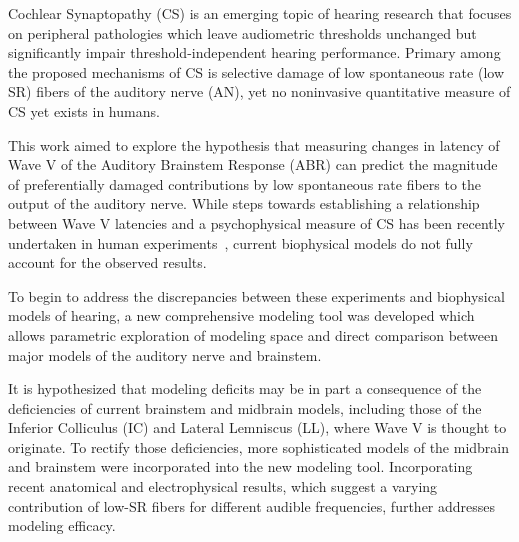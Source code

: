 Cochlear Synaptopathy (CS) is an emerging topic of hearing research that focuses on peripheral pathologies which leave audiometric thresholds unchanged but significantly impair threshold-independent hearing performance. Primary among the proposed mechanisms of CS is selective damage of low spontaneous rate (low SR) fibers of the auditory nerve (AN), yet no noninvasive quantitative measure of CS yet exists in humans.

This work aimed to explore the hypothesis that measuring changes in latency of Wave V of the Auditory Brainstem Response (ABR) can predict the magnitude of preferentially damaged contributions by low spontaneous rate fibers to the output of the auditory nerve. While steps towards establishing a relationship between Wave V latencies and a psychophysical measure of CS has been recently undertaken in human experiments~\cite{Mehraei2016Auditory}, current biophysical models do not fully account for the observed results.

To begin to address the discrepancies between these experiments and biophysical models of hearing, a new comprehensive modeling tool was developed which allows parametric exploration of modeling space and direct comparison between major models of the auditory nerve and brainstem. 

It is hypothesized that modeling deficits may be in part a consequence of the deficiencies of current brainstem and midbrain models, including those of the Inferior Colliculus (IC) and Lateral Lemniscus (LL), where Wave V is thought to originate.  To rectify those deficiencies, more sophisticated models of the midbrain and brainstem were incorporated into the new modeling tool. Incorporating recent anatomical and electrophysical results, which suggest a varying contribution of low-SR fibers for different audible frequencies, further addresses modeling efficacy.
